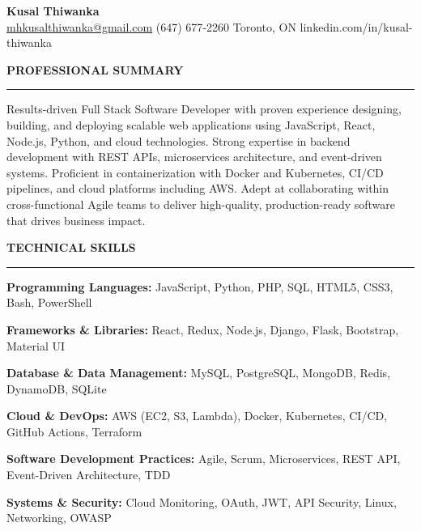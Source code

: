\documentclass[10pt,letterpaper]{article}
\begin{document}
\begin{center}
{\LARGE\textbf{Kusal Thiwanka}}\\[3pt]
\href{mailto:mhkusalthiwanka@gmail.com}{mhkusalthiwanka@gmail.com}\hspace{2em}%
(647) 677{-}2260\hspace{2em}%
Toronto, ON\hspace{2em}
linkedin.com/in/kusal-thiwanka
\end{center}

\vspace{6pt}

\textbf{PROFESSIONAL SUMMARY}\\[-8pt]
\noindent\rule{\textwidth}{1pt}

\vspace{-2pt}

Results-driven Full Stack Software Developer with proven experience designing, building, and deploying scalable web applications using JavaScript, React, Node.js, Python, and cloud technologies. Strong expertise in backend development with REST APIs, microservices architecture, and event-driven systems. Proficient in containerization with Docker and Kubernetes, CI/CD pipelines, and cloud platforms including AWS. Adept at collaborating within cross-functional Agile teams to deliver high-quality, production-ready software that drives business impact.

\vspace{8pt}

\textbf{TECHNICAL SKILLS}\\[-8pt]
\noindent\rule{\textwidth}{1pt}

\vspace{-2pt}

\textbf{Programming Languages:} JavaScript, Python, PHP, SQL, HTML5, CSS3, Bash, PowerShell

\textbf{Frameworks \& Libraries:} React, Redux, Node.js, Django, Flask, Bootstrap, Material UI

\textbf{Database \& Data Management:} MySQL, PostgreSQL, MongoDB, Redis, DynamoDB, SQLite

\textbf{Cloud \& DevOps:} AWS (EC2, S3, Lambda), Docker, Kubernetes, CI/CD, GitHub Actions, Terraform

\textbf{Software Development Practices:} Agile, Scrum, Microservices, REST API, Event-Driven Architecture, TDD

\textbf{Systems \& Security:} Cloud Monitoring, OAuth, JWT, API Security, Linux, Networking, OWASP
\end{document}
